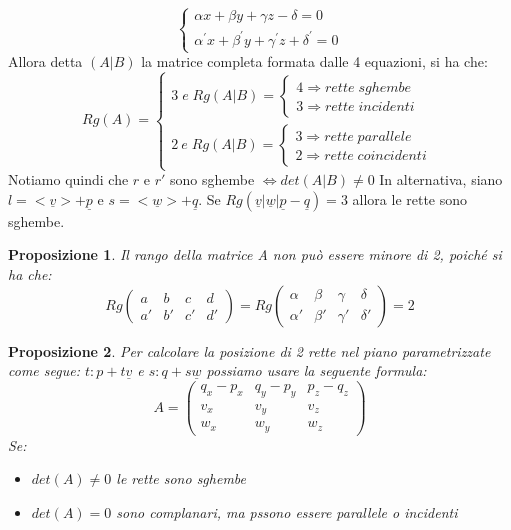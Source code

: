 \documentclass[12pt]{article}
\newenvironment{para}{\begin{adjustwidth}{13mm}{}}{\end{adjustwidth}}
\newtheorem{Proposizione}{Proposizione}[subsection]
\begin{document}
\begin{para}
$$\begin{cases}
    \alpha x+\beta y+\gamma z-\delta = 0 \\
    \alpha^{'}x+\beta^{'}y + \gamma^{'}z+ \delta^{'} = 0
\end{cases}$$
Allora detta $(A|B)$ la matrice completa formata dalle 4 equazioni, si ha che:
$$Rg(A) = \begin{cases}
    3 \; e \; Rg(A|B) = \begin{cases}
        4 \Rightarrow rette \; sghembe \\
        3 \Rightarrow rette \; incidenti
    \end{cases}\\
    2 \: e \; Rg(A|B) = \begin{cases}
        3 \Rightarrow rette \; parallele \\
        2 \Rightarrow rette \; coincidenti
    \end{cases}
\end{cases}$$
Notiamo quindi che $r$ e $r'$ sono sghembe $\Leftrightarrow det(A|B) \neq 0$
In alternativa, siano $l = <\underline{v}> + \underline{p}$ e $s = <\underline{w}> + \underline{q}$. Se $Rg(\underline{v}|\underline{w}|\underline{p}-\underline{q}) = 3$ allora le rette sono sghembe.
\begin{Proposizione}
    Il rango della matrice A non può essere minore di 2, poiché si ha che: $$Rg\begin{pmatrix}
        a & b & c & d \\
        a' & b' & c' & d'
    \end{pmatrix} = Rg\begin{pmatrix}
        \alpha & \beta & \gamma & \delta \\
        \alpha' & \beta' & \gamma' & \delta'
    \end{pmatrix} = 2$$
\end{Proposizione}
\begin{Proposizione}
    Per calcolare la posizione di 2 rette nel piano parametrizzate come segue: $t: p +t\underline{v}$ e $s: q+s\underline{w}$ possiamo usare la seguente formula: $$ A =\begin{pmatrix}
        q_x - p_x & q_y - p_y & p_z - q_z \\
        v_x & v_y & v_z \\
        w_x & w_y & w_z
    \end{pmatrix}$$
Se: \begin{itemize}
    \item $det(A) \neq 0$ le rette sono sghembe
    \item $det(A) = 0$ sono complanari, ma pssono essere parallele o incidenti

\end{itemize}
\end{Proposizione}
\end{para}
\end{document}
